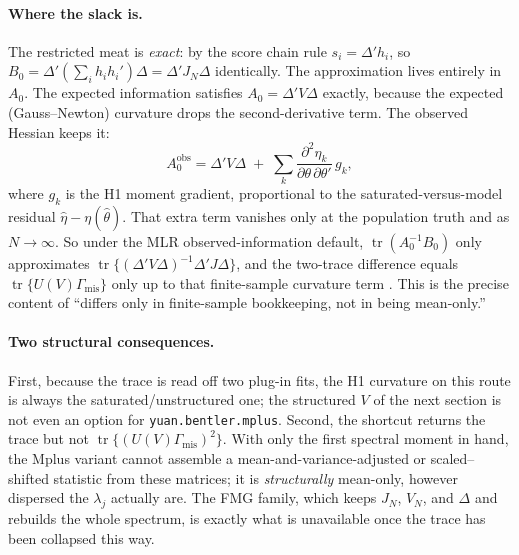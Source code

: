 \documentclass[11pt]{article}
\newcommand{\tr}{\operatorname{tr}}
\begin{document}
\paragraph{Where the slack is.} The restricted meat is \emph{exact}: by the
score chain rule \(s_i=\Delta'h_i\), so
\(B_0=\Delta'(\sum_i h_ih_i')\Delta=\Delta'J_N\Delta\) identically. The
approximation lives entirely in \(A_0\). The expected information satisfies
\(A_0=\Delta'V\Delta\) exactly, because the expected (Gauss--Newton) curvature
drops the second-derivative term. The observed Hessian keeps it:
\[
  A_0^{\mathrm{obs}}
    =
  \Delta'V\Delta
  \;+\;
  \sum_k \frac{\partial^2\eta_k}{\partial\theta\,\partial\theta'}\, g_k,
\]
where \(g_k\) is the H1 moment gradient, proportional to the
saturated-versus-model residual \(\hat\eta-\eta(\hat\theta)\). That extra term
vanishes only at the population truth and as \(N\to\infty\). So under the MLR
observed-information default, \(\tr(A_0^{-1}B_0)\) only approximates
\(\tr\{(\Delta'V\Delta)^{-1}\Delta'J\Delta\}\), and the two-trace difference
equals \(\tr\{U(V)\Gamma_{\mathrm{mis}}\}\) only up to that finite-sample
curvature term \cite{yuanbentler2000,savalei2010}. This is the precise content
of ``differs only in finite-sample bookkeeping, not in being mean-only.''

\paragraph{Two structural consequences.} First, because the trace is read off
two plug-in fits, the H1 curvature on this route is always the
saturated/unstructured one; the structured \(V\) of the next section is not even
an option for \texttt{yuan.bentler.mplus}. Second, the shortcut returns the
trace but not \(\tr\{(U(V)\Gamma_{\mathrm{mis}})^2\}\). With only the first
spectral moment in hand, the Mplus variant cannot assemble a
mean-and-variance-adjusted or scaled--shifted statistic from these matrices; it
is \emph{structurally} mean-only, however dispersed the \(\lambda_j\) actually
are. The FMG family, which keeps \(J_N\), \(V_N\), and \(\Delta\) and rebuilds
the whole spectrum, is exactly what is unavailable once the trace has been
collapsed this way.
\end{document}
